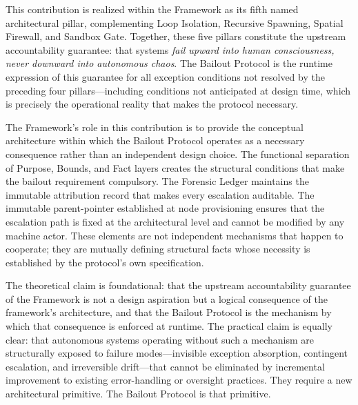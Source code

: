 This contribution is realized within the \bxthree{} Framework as its fifth named architectural pillar, complementing Loop Isolation, Recursive Spawning, Spatial Firewall, and Sandbox Gate. Together, these five pillars constitute the upstream accountability guarantee: that \bxthree{} systems \emph{fail upward into human consciousness, never downward into autonomous chaos}. The Bailout Protocol is the runtime expression of this guarantee for all exception conditions not resolved by the preceding four pillars---including conditions not anticipated at design time, which is precisely the operational reality that makes the protocol necessary.

The \bxthree{} Framework's role in this contribution is to provide the conceptual architecture within which the Bailout Protocol operates as a necessary consequence rather than an independent design choice. The functional separation of Purpose, Bounds, and Fact layers creates the structural conditions that make the bailout requirement compulsory. The Forensic Ledger maintains the immutable attribution record that makes every escalation auditable. The immutable parent-pointer established at node provisioning ensures that the escalation path is fixed at the architectural level and cannot be modified by any machine actor. These elements are not independent mechanisms that happen to cooperate; they are mutually defining structural facts whose necessity is established by the protocol's own specification.

The theoretical claim is foundational: that the upstream accountability guarantee of the \bxthree{} Framework is not a design aspiration but a logical consequence of the framework's architecture, and that the Bailout Protocol is the mechanism by which that consequence is enforced at runtime. The practical claim is equally clear: that autonomous systems operating without such a mechanism are structurally exposed to failure modes---invisible exception absorption, contingent escalation, and irreversible drift---that cannot be eliminated by incremental improvement to existing error-handling or oversight practices. They require a new architectural primitive. The Bailout Protocol is that primitive.
